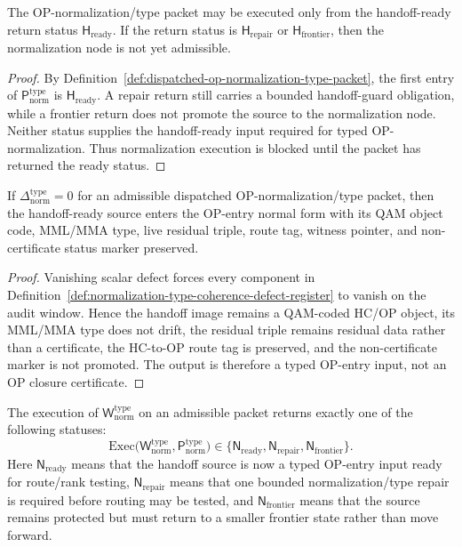\begin{lemma}
\label{lem:handoff-ready-return-is-normalization-precondition}
The OP-normalization/type packet may be executed only from the handoff-ready return status \(\mathsf H_{\mathrm{ready}}\). If the return status is \(\mathsf H_{\mathrm{repair}}\) or \(\mathsf H_{\mathrm{frontier}}\), then the normalization node is not yet admissible.
\end{lemma}

\begin{proof}
By Definition~\ref{def:dispatched-op-normalization-type-packet}, the first entry of \(\mathsf P_{\mathrm{norm}}^{\mathrm{type}}\) is \(\mathsf H_{\mathrm{ready}}\). A repair return still carries a bounded handoff-guard obligation, while a frontier return does not promote the source to the normalization node. Neither status supplies the handoff-ready input required for typed OP-normalization. Thus normalization execution is blocked until the packet has returned the ready status.
\end{proof}

\begin{lemma}
\label{lem:zero-normalization-type-defect-preserves-op-entry-data}
If \(\Delta_{\mathrm{norm}}^{\mathrm{type}}=0\) for an admissible dispatched OP-normalization/type packet, then the handoff-ready source enters the OP-entry normal form with its QAM object code, MML/MMA type, live residual triple, route tag, witness pointer, and non-certificate status marker preserved.
\end{lemma}

\begin{proof}
Vanishing scalar defect forces every component in Definition~\ref{def:normalization-type-coherence-defect-register} to vanish on the audit window. Hence the handoff image remains a QAM-coded HC/OP object, its MML/MMA type does not drift, the residual triple remains residual data rather than a certificate, the HC-to-OP route tag is preserved, and the non-certificate marker is not promoted. The output is therefore a typed OP-entry input, not an OP closure certificate.
\end{proof}

\begin{definition}
\label{def:r18-op-normalization-type-return}
The execution of \(\mathsf W_{\mathrm{norm}}^{\mathrm{type}}\) on an admissible packet returns exactly one of the following statuses:
\[
\mathrm{Exec}\bigl(\mathsf W_{\mathrm{norm}}^{\mathrm{type}},
 \mathsf P_{\mathrm{norm}}^{\mathrm{type}}\bigr)
\in
\{\mathsf N_{\mathrm{ready}},\mathsf N_{\mathrm{repair}},\mathsf N_{\mathrm{frontier}}\}.
\]
Here \(\mathsf N_{\mathrm{ready}}\) means that the handoff source is now a typed OP-entry input ready for route/rank testing, \(\mathsf N_{\mathrm{repair}}\) means that one bounded normalization/type repair is required before routing may be tested, and \(\mathsf N_{\mathrm{frontier}}\) means that the source remains protected but must return to a smaller frontier state rather than move forward.
\end{definition}

